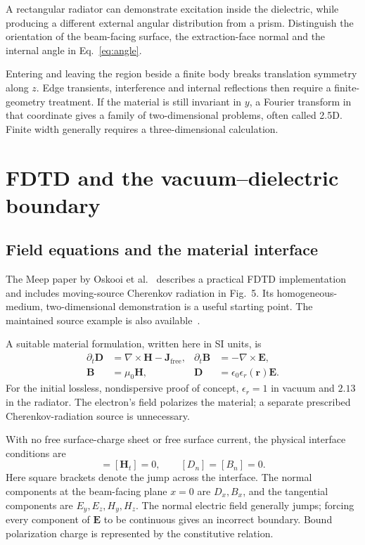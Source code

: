 \documentclass[11pt,a4paper]{article}
\numberwithin{equation}{section}
\begin{document}
A rectangular radiator can demonstrate excitation inside the dielectric,
while producing a different external angular distribution from a prism.
Distinguish the orientation of the beam-facing surface, the extraction-face
normal and the internal angle in Eq.~\eqref{eq:angle}.

Entering and leaving the region beside a finite body breaks translation
symmetry along \(z\). Edge transients, interference and internal reflections
then require a finite-geometry treatment. If the material is still invariant
in \(y\), a Fourier transform in that coordinate gives a family of
two-dimensional problems, often called 2.5D. Finite width generally requires
a three-dimensional calculation.

\section{FDTD and the vacuum--dielectric boundary}
\label{sec:fdtd}

\subsection{Field equations and the material interface}

The Meep paper by Oskooi et al.~\cite{oskooi2010meep} describes a practical
FDTD implementation and includes moving-source Cherenkov radiation in
Fig.~5. Its homogeneous-medium, two-dimensional demonstration is a useful
starting point. The maintained source example is also available~\cite{meepMovingSource}.

A suitable material formulation, written here in SI units, is
\begin{align}
 \partial_t\mathbf D&=\nabla\times\mathbf H-\mathbf J_{\mathrm{free}},
 &\partial_t\mathbf B&=-\nabla\times\mathbf E, \label{eq:maxwell}\\
 \mathbf B&=\mu_0\mathbf H,
 &\mathbf D&=\epsilon_0\epsilon_r(\mathbf r)\mathbf E. \label{eq:constitutive}
\end{align}
For the initial lossless, nondispersive proof of concept,
\(\epsilon_r=1\) in vacuum and \(2.13\) in the radiator.
The electron's field polarizes the material; a separate prescribed
Cherenkov-radiation source is unnecessary.

With no free surface-charge sheet or free surface current, the physical
interface conditions are
\begin{equation}
 [\mathbf E_t]=[\mathbf H_t]=0,\qquad [D_n]=[B_n]=0.
 \label{eq:interface}
\end{equation}
Here square brackets denote the jump across the interface. The normal
components at the beam-facing plane \(x=0\) are \(D_x,B_x\), and the
tangential components are \(E_y,E_z,H_y,H_z\). The normal
electric field generally jumps; forcing every component of \(\mathbf E\)
to be continuous gives an incorrect boundary. Bound polarization charge
is represented by the constitutive relation.
\end{document}

